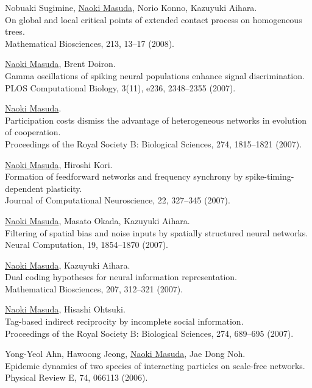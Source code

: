 \documentclass[11pt,letter]{article}
\begin{document}
\begin{etaremune}
\item Nobuaki Sugimine, \underline{Naoki Masuda}, Norio Konno, Kazuyuki Aihara.\\
On global and local critical points of extended contact process on homogeneous trees.\\
Mathematical Biosciences, 213, 13--17 (2008).

\item \underline{Naoki Masuda}, Brent Doiron.\\
Gamma oscillations of spiking neural populations enhance signal discrimination.\\
PLOS Computational Biology, 3(11), e236, 2348--2355 (2007).

\item \underline{Naoki Masuda}.\\
Participation costs dismiss the advantage of heterogeneous networks in evolution of cooperation.\\
Proceedings of the Royal Society B: Biological Sciences, 274, 1815--1821 (2007).

\item \underline{Naoki Masuda}, Hiroshi Kori.\\
Formation of feedforward networks and frequency synchrony by spike-timing-dependent plasticity.\\
Journal of Computational Neuroscience, 22, 327--345 (2007).

\item \underline{Naoki Masuda}, Masato Okada, Kazuyuki Aihara.\\
Filtering of spatial bias and noise inputs by spatially structured neural networks.\\
Neural Computation, 19, 1854--1870 (2007).

\item \underline{Naoki Masuda}, Kazuyuki Aihara.\\
Dual coding hypotheses for neural information representation.\\
Mathematical Biosciences, 207, 312--321 (2007).

\item \underline{Naoki Masuda}, Hisashi Ohtsuki.\\
Tag-based indirect reciprocity by incomplete social information.\\
Proceedings of the Royal Society B: Biological Sciences, 274, 689--695 (2007).

\item Yong-Yeol Ahn, Hawoong Jeong, \underline{Naoki Masuda}, Jae Dong Noh.\\
Epidemic dynamics of two species of interacting particles on scale-free networks.\\
Physical Review E, 74, 066113 (2006).


\end{etaremune}
\end{document}
